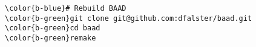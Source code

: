 \documentclass[class=minimal,border=0]{standalone}
\begin{document}
%
\begin{BVerbatim}[bgcolor=b-darkgrey]
\color{b-blue}# Rebuild BAAD
\color{b-green}git clone git@github.com:dfalster/baad.git
\color{b-green}cd baad
\color{b-green}remake
\end{BVerbatim}
\end{document}

